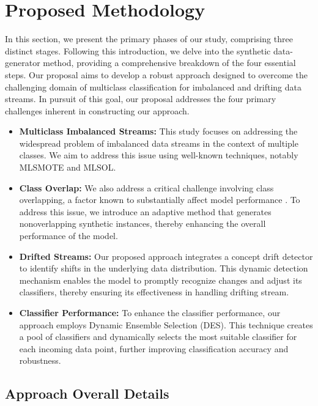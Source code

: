 \section{Proposed Methodology}\label{sec:4_first_proposed_approach}

In this section, we present the primary phases of our study, comprising three distinct stages. Following this introduction, we delve into the synthetic data-generator method, providing a comprehensive breakdown of the four essential steps. Our proposal aims to develop a robust approach designed to overcome the challenging domain of multiclass classification for imbalanced and drifting data streams. In pursuit of this goal, our proposal addresses the four primary challenges inherent in constructing our approach.
\begin{itemize}
	\item \textbf{Multiclass Imbalanced Streams:} This study focuses on addressing the widespread problem of imbalanced data streams in the context of multiple classes. We aim to address this issue using well-known techniques, notably MLSMOTE and MLSOL.
	\item \textbf{Class Overlap:} We also address a critical challenge involving class overlapping, a factor known to substantially affect model performance \cite{cruz2017meta}\cite{widmer1996learning}. To address this issue, we introduce an adaptive method that generates nonoverlapping synthetic instances, thereby enhancing the overall performance of the model.
	\item \textbf{Drifted Streams:} Our proposed approach integrates a concept drift detector to identify shifts in the underlying data distribution. This dynamic detection mechanism enables the model to promptly recognize changes and adjust its classifiers, thereby ensuring its effectiveness in handling drifting stream.
	\item \textbf{Classifier Performance:} To enhance the classifier performance, our approach employs Dynamic Ensemble Selection (DES). This technique creates a pool of classifiers and dynamically selects the most suitable classifier for each incoming data point, further improving classification accuracy and robustness.
\end{itemize}

\subsection{Approach Overall Details}

